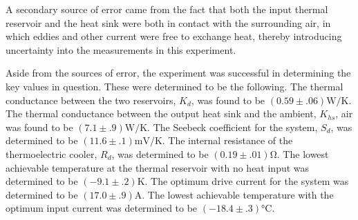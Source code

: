 \begin{paper}
	A secondary source of error came from the fact that both the input thermal reservoir and the heat sink were both in contact with the surrounding air, in which eddies and other current were free to exchange heat, thereby introducing uncertainty into the measurements in this experiment.
	
	Aside from the sources of error, the experiment was successful in determining the key values in question. These were determined to be the following.
The thermal conductance between the two reservoirs, $K_d$, was found to be $(0.59\pm.06)\si{\watt\per\kelvin}$.
The thermal conductance between the output heat sink and the ambient, $K_{hs}$, air was found to be $(7.1\pm.9)\si{\watt\per\kelvin}$.
The Seebeck coefficient for the system, $S_d$, was determined to be $(11.6\pm.1)\si{\milli\volt\per\kelvin}$.
The internal resistance of the thermoelectric cooler, $R_d$, was determined to be $(0.19\pm.01)\si{\ohm}$.
The lowest achievable temperature at the thermal reservoir with no heat input was determined to be $(-9.1\pm.2)\si{\kelvin}$.
The optimum drive current for the system was determined to be $(17.0\pm.9)\si{\ampere}$.
The lowest achievable temperature with the optimum input current was determined to be $(-18.4\pm.3)\si{\celsius}$.



\end{paper}
